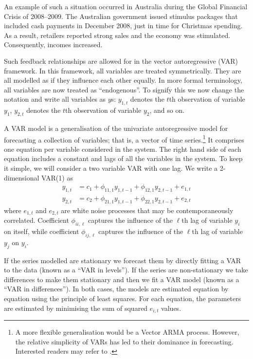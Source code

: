 \documentclass[]{book}
\let\rmarkdownfootnote\footnote%
\def\footnote{\protect\rmarkdownfootnote}
\begin{document}
An example of such a situation occurred in Australia during the Global Financial Crisis of 2008--2009. The Australian government issued stimulus packages that included cash payments in December 2008, just in time for Christmas spending. As a result, retailers reported strong sales and the economy was stimulated. Consequently, incomes increased.

Such feedback relationships are allowed for in the vector autoregressive (VAR) framework. In this framework, all variables are treated symmetrically. They are all modelled as if they influence each other equally. In more formal terminology, all variables are now treated as ``endogenous''. To signify this we now change the notation and write all variables as \(y\)s: \(y_{1,t}\) denotes the \(t\)th observation of variable \(y_1\), \(y_{2,t}\) denotes the \(t\)th observation of variable \(y_2\), and so on.

A VAR model is a generalisation of the univariate autoregressive model for forecasting a collection of variables; that is, a vector of time series.\footnote{A more flexible generalisation would be a Vector ARMA process. However, the relative simplicity of VARs has led to their dominance in forecasting. Interested readers may refer to \citet{AthEtAl2012}.} It comprises one equation per variable considered in the system. The right hand side of each equation includes a constant and lags of all the variables in the system. To keep it simple, we will consider a two variable VAR with one lag. We write a 2-dimensional VAR(1) as
\begin{align}
\label{var1a}
  y_{1,t} &= c_1+\phi _{11,1}y_{1,t-1}+\phi _{12,1}y_{2,t-1}+e_{1,t} \label{eq:var1a}\\
  y_{2,t} &= c_2+\phi _{21,1}y_{1,t-1}+\phi _{22,1}y_{2,t-1}+e_{2,t} \label{eq:var1b}
\end{align}
where \(e_{1,t}\) and \(e_{2,t}\) are white noise processes that may be contemporaneously correlated. Coefficient \(\phi_{ii,\ell}\) captures the influence of the \(\ell\)th lag of variable \(y_i\) on itself, while coefficient \(\phi_{ij,\ell}\) captures the influence of the \(\ell\)th lag of variable \(y_j\) on \(y_i\).

If the series modelled are stationary we forecast them by directly fitting a VAR to the data (known as a ``VAR in levels''). If the series are non-stationary we take differences to make them stationary and then we fit a VAR model (known as a ``VAR in differences''). In both cases, the models are estimated equation by equation using the principle of least squares. For each equation, the parameters are estimated by minimising the sum of squared \(e_{i,t}\) values.
\end{document}
